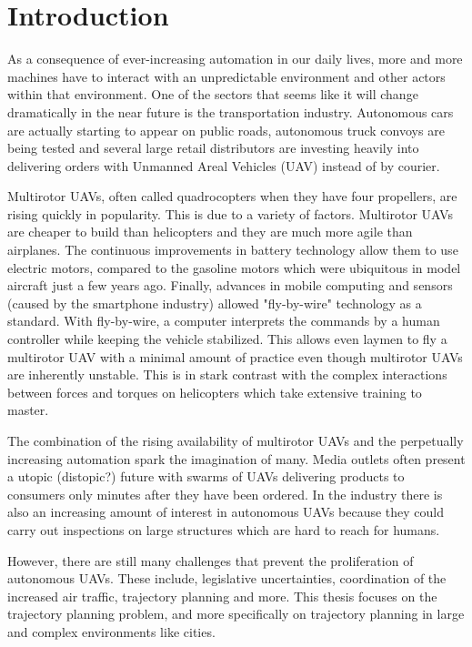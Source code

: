 \chapter{Introduction}
As a consequence of ever-increasing automation in our daily lives, more and more machines have to interact with an unpredictable environment and other actors within that environment. One of the sectors that seems like it will change dramatically in the near future is the transportation industry. Autonomous cars are actually starting to appear on public roads, autonomous truck convoys are being tested and several large retail distributors are investing heavily into delivering orders with Unmanned Areal Vehicles (UAV) instead of by courier. 
\par
Multirotor UAVs, often called quadrocopters when they have four propellers, are rising quickly in popularity. This is due to a variety of factors. Multirotor UAVs are cheaper to build than helicopters and they are much more agile than airplanes. The continuous improvements in battery technology allow them to use electric motors, compared to the gasoline motors which were ubiquitous in model aircraft just a few years ago. Finally, advances in mobile computing and sensors (caused by the smartphone industry) allowed "fly-by-wire" technology as a standard. With fly-by-wire, a computer interprets the commands by a human controller while keeping the vehicle stabilized. This allows even laymen to fly a multirotor UAV with a minimal amount of practice even though multirotor UAVs are inherently unstable. This is in stark contrast with the complex interactions between forces and torques on helicopters which take extensive training to master.
\par
The combination of the rising availability of multirotor UAVs and the perpetually increasing automation spark the imagination of many. Media outlets often present a utopic (distopic?) future with swarms of UAVs delivering products to consumers only minutes after they have been ordered. In the industry there is also an increasing amount of interest in autonomous UAVs because they could carry out inspections on large structures which are hard to reach for humans.
\par
However, there are still many challenges that prevent the proliferation of autonomous UAVs. These include, legislative uncertainties, coordination of the increased air traffic, trajectory planning and more. This thesis focuses on the trajectory planning problem, and more specifically on trajectory planning in large and complex environments like cities.
